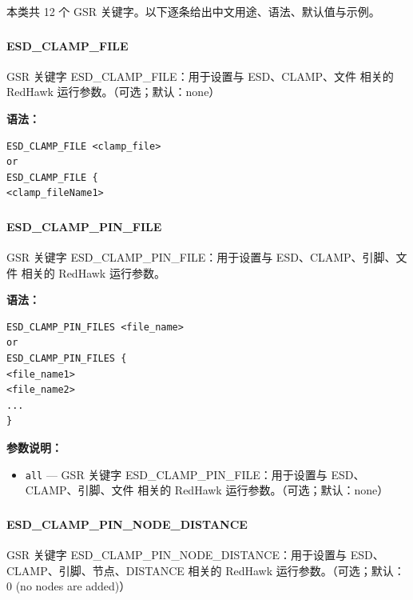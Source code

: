 本类共 12 个 GSR 关键字。以下逐条给出中文用途、语法、默认值与示例。

\subsubsection{}
\paragraph*{ESD_CLAMP_FILE}

GSR 关键字 ESD_CLAMP_FILE：用于设置与 ESD、CLAMP、文件 相关的 RedHawk 运行参数。（可选；默认：none）

\textbf{语法：}
\begin{lstlisting}
ESD_CLAMP_FILE <clamp_file>
or
ESD_CLAMP_FILE {
<clamp_fileName1>
\end{lstlisting}

\subsubsection{}
\paragraph*{ESD_CLAMP_PIN_FILE}

GSR 关键字 ESD_CLAMP_PIN_FILE：用于设置与 ESD、CLAMP、引脚、文件 相关的 RedHawk 运行参数。

\textbf{语法：}
\begin{lstlisting}
ESD_CLAMP_PIN_FILES <file_name>
or
ESD_CLAMP_PIN_FILES {
<file_name1>
<file_name2>
...
}
\end{lstlisting}

\textbf{参数说明：}
\begin{itemize}
\item \texttt{all} — GSR 关键字 ESD\_CLAMP\_PIN\_FILE：用于设置与 ESD、CLAMP、引脚、文件 相关的 RedHawk 运行参数。（可选；默认：none）
\end{itemize}

\subsubsection{}
\paragraph*{ESD_CLAMP_PIN_NODE_DISTANCE}

GSR 关键字 ESD_CLAMP_PIN_NODE_DISTANCE：用于设置与 ESD、CLAMP、引脚、节点、DISTANCE 相关的 RedHawk 运行参数。（可选；默认：0 (no nodes are added)）

